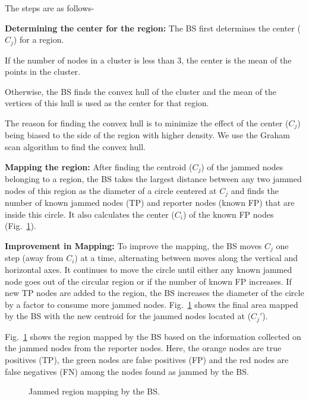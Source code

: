 \documentclass[conference]{IEEEtran}
\begin{document}
The steps are as follows-

\begin{list}{}{\leftmargin=1em}
\item
{\bf Determining the center for the region:} The BS first determines the center ($C_{j}$) for a region.


If the number of nodes in a cluster is less than $3$, the center is the mean of the points in the cluster.

Otherwise, the BS finds the convex hull of the cluster and the mean of the vertices of this hull is used as the center for that region.


The reason for finding the convex hull is to minimize the effect of the center ($C_{j}$) being biased to the side of the region with higher density. We use the Graham scan algorithm to find the convex hull. 

\item
{\bf Mapping the region:}
After finding the centroid ($C_{j}$) of the jammed nodes belonging to a region, the BS takes the largest distance between any two jammed nodes of this region as the diameter of a circle centered at $C_{j}$ and finds the number of known jammed nodes (TP) and reporter nodes (known FP) that are inside this circle. It also calculates the center ($C_{i}$) of the known FP nodes (Fig.~\ref{fig:areamap2}). 


\item
{\bf Improvement in Mapping:}
To improve the mapping, the BS moves $C_{j}$ one step (away from $C_{i}$) at a time, alternating between moves along the vertical and horizontal axes. It continues to move the circle until either any known jammed node goes out of the circular region or if the number of known FP increases. If new TP nodes are added to the region, the BS increases the diameter of the circle by a factor to consume more jammed nodes. Fig.~\ref{fig:areamap2} shows the final area mapped by the BS with the new centroid for the jammed nodes located at ($C_{j}'$).

Fig.~\ref{fig:areamap2} shows the region mapped by the BS based on the information collected on the jammed nodes from the reporter nodes. Here, the orange nodes are true positives (TP), the green nodes are false positives (FP) and the red nodes are false negatives (FN) among the nodes found as jammed by the BS.

\begin{figure}
  \begin{center}
    \hspace{.1in}    
  \end{center}
  \caption{Jammed region mapping by the BS.}
  \label{fig:areamap2}
\end{figure}


\end{list}
\end{document}

